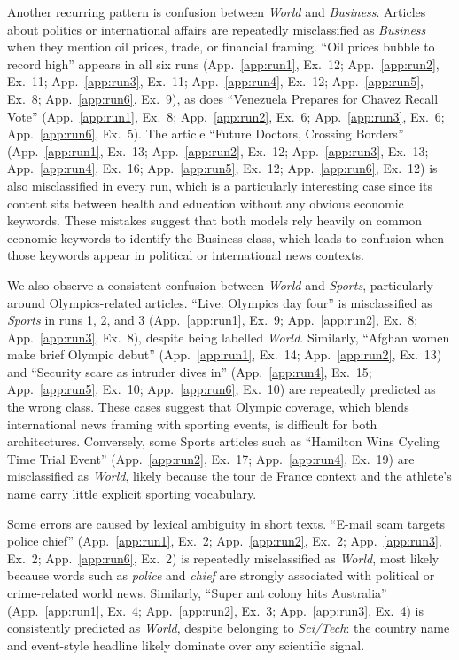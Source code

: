 Another recurring pattern is confusion between \textit{World} and \textit{Business}. Articles about politics or international affairs are repeatedly misclassified as \textit{Business} when they mention oil prices, trade, or financial framing. ``Oil prices bubble to record high'' appears in all six runs (App.~\ref{app:run1}, Ex.~12; App.~\ref{app:run2}, Ex.~11; App.~\ref{app:run3}, Ex.~11; App.~\ref{app:run4}, Ex.~12; App.~\ref{app:run5}, Ex.~8; App.~\ref{app:run6}, Ex.~9), as does ``Venezuela Prepares for Chavez Recall Vote'' (App.~\ref{app:run1}, Ex.~8; App.~\ref{app:run2}, Ex.~6; App.~\ref{app:run3}, Ex.~6; App.~\ref{app:run6}, Ex.~5). The article ``Future Doctors, Crossing Borders'' (App.~\ref{app:run1}, Ex.~13; App.~\ref{app:run2}, Ex.~12; App.~\ref{app:run3}, Ex.~13; App.~\ref{app:run4}, Ex.~16; App.~\ref{app:run5}, Ex.~12; App.~\ref{app:run6}, Ex.~12) is also misclassified in every run, which is a particularly interesting case since its content sits between health and education without any obvious economic keywords. These mistakes suggest that both models rely heavily on common economic keywords to identify the Business class, which leads to confusion when those keywords appear in political or international news contexts.

We also observe a consistent confusion between \textit{World} and \textit{Sports}, particularly around Olympics-related articles. ``Live: Olympics day four'' is misclassified as \textit{Sports} in runs 1, 2, and 3 (App.~\ref{app:run1}, Ex.~9; App.~\ref{app:run2}, Ex.~8; App.~\ref{app:run3}, Ex.~8), despite being labelled \textit{World}. Similarly, ``Afghan women make brief Olympic debut'' (App.~\ref{app:run1}, Ex.~14; App.~\ref{app:run2}, Ex.~13) and ``Security scare as intruder dives in'' (App.~\ref{app:run4}, Ex.~15; App.~\ref{app:run5}, Ex.~10; App.~\ref{app:run6}, Ex.~10) are repeatedly predicted as the wrong class. These cases suggest that Olympic coverage, which blends international news framing with sporting events, is difficult for both architectures. Conversely, some Sports articles such as ``Hamilton Wins Cycling Time Trial Event'' (App.~\ref{app:run2}, Ex.~17; App.~\ref{app:run4}, Ex.~19) are misclassified as \textit{World}, likely because the tour de France context and the athlete's name carry little explicit sporting vocabulary.

Some errors are caused by lexical ambiguity in short texts. ``E-mail scam targets police chief'' (App.~\ref{app:run1}, Ex.~2; App.~\ref{app:run2}, Ex.~2; App.~\ref{app:run3}, Ex.~2; App.~\ref{app:run6}, Ex.~2) is repeatedly misclassified as \textit{World}, most likely because words such as \textit{police} and \textit{chief} are strongly associated with political or crime-related world news. Similarly, ``Super ant colony hits Australia'' (App.~\ref{app:run1}, Ex.~4; App.~\ref{app:run2}, Ex.~3; App.~\ref{app:run3}, Ex.~4) is consistently predicted as \textit{World}, despite belonging to \textit{Sci/Tech}: the country name and event-style headline likely dominate over any scientific signal.

